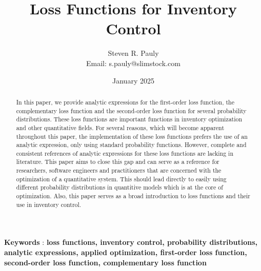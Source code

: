 \documentclass{article}
\title{Loss Functions for Inventory Control}
\author{Steven R. Pauly \\ Email: s.pauly@slimstock.com}
\date{January 2025}
\begin{document}
\maketitle

\begin{abstract}
    In this paper, we provide analytic expressions for the first-order loss function, the complementary loss function and the second-order loss function for several probability distributions.
    These loss functions are important functions in inventory optimization and other quantitative fields.
    For several reasons, which will become apparent throughout this paper, the implementation of these loss functions prefers the use of an analytic expression, only using standard probability functions.
    However, complete and consistent references of analytic expressions for these loss functions are lacking in literature.
    This paper aims to close this gap and can serve as a reference for researchers, software engineers and practitioners that are concerned with the optimization of a quantitative system.
    This should lead directly to easily using different probability distributions in quantitive models which is at the core of optimization.
    Also, this paper serves as a broad introduction to loss functions and their use in inventory control.
\end{abstract}

\textbf{Keywords} : \textbf{loss functions, inventory control, probability distributions, analytic expressions, applied optimization, first-order loss function, second-order loss function, complementary loss function}
\end{document}
